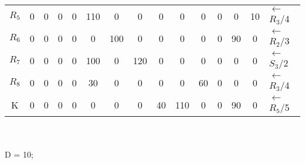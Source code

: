 \documentclass[12pt]{article}
\begin{document}
\begin{enumerate}
\begin{tabular}{|c|c|c|c|c|c|c|c|c|c|c|c|c|c|l}
$R_5$ & 0   & {\color[HTML]{000000} 0}        & {\color[HTML]{000000} 0}        & {\color[HTML]{000000} 0}        & {\color[HTML]{000000} 110} & {\color[HTML]{000000} 0}   & {\color[HTML]{000000} 0}   & {\color[HTML]{000000} 0}  & {\color[HTML]{000000} 0}   & {\color[HTML]{000000} 0}  & {\color[HTML]{000000} 0}   & {\color[HTML]{000000} 0}   & {\color[HTML]{FE0000} 10}  & ${\leftarrow}$ $R_3$/4 \\ \cline{1-14}
$R_6$ & 0   & {\color[HTML]{000000} 0}        & {\color[HTML]{000000} 0}        & {\color[HTML]{000000} 0}        & {\color[HTML]{000000} 0}   & {\color[HTML]{000000} 100} & {\color[HTML]{000000} 0}   & {\color[HTML]{000000} 0}  & {\color[HTML]{000000} 0}   & {\color[HTML]{000000} 0}  & {\color[HTML]{000000} 0}   & {\color[HTML]{000000} 90}  & {\color[HTML]{000000} 0}   & ${\leftarrow}$ $R_2$/3 \\ \cline{1-14}
$R_7$ & 0   & {\color[HTML]{000000} 0}        & {\color[HTML]{000000} 0}        & {\color[HTML]{000000} 0}        & {\color[HTML]{000000} 100} & {\color[HTML]{000000} 0}   & {\color[HTML]{FE0000} 120} & {\color[HTML]{000000} 0}  & {\color[HTML]{000000} 0}   & {\color[HTML]{000000} 0}  & {\color[HTML]{000000} 0}   & {\color[HTML]{000000} 0}   & {\color[HTML]{000000} 0}   & ${\leftarrow}$ $S_3$/2 \\ \cline{1-14}
$R_8$ & 0   & {\color[HTML]{000000} 0}        & {\color[HTML]{000000} 0}        & {\color[HTML]{000000} 0}        & {\color[HTML]{000000} 30}  & {\color[HTML]{000000} 0}   & {\color[HTML]{000000} 0}   & {\color[HTML]{000000} 0}  & {\color[HTML]{000000} 0}   & {\color[HTML]{000000} 60} & {\color[HTML]{000000} 0}   & {\color[HTML]{000000} 0}   & {\color[HTML]{000000} 0}   & ${\leftarrow}$ $R_3$/4 \\ \cline{1-14}
K     & 0   & {\color[HTML]{000000} 0}        & {\color[HTML]{000000} 0}        & {\color[HTML]{000000} 0}        & {\color[HTML]{000000} 0}   & {\color[HTML]{000000} 0}   & {\color[HTML]{000000} 0}   & {\color[HTML]{000000} 40} & {\color[HTML]{000000} 110} & {\color[HTML]{000000} 0}  & {\color[HTML]{000000} 0}   & {\color[HTML]{000000} 90}  & {\color[HTML]{000000} 0}   & ${\leftarrow}$ $R_5$/5 \\ \cline{1-14}
\end{tabular}
\\ \\
D = 10;
\\ \\ \\
\begin{tabular}{|c|c|c|c|c|c|c|c|c|c|c|c|c|c|l}

\end{tabular}
\end{enumerate}
\end{document}
